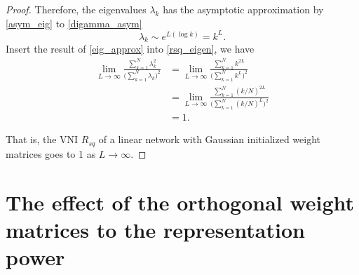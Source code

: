 \begin{proof}
    Therefore, the eigenvalues $\lambda_k$ has the asymptotic approximation by \eqref{asym_eig} to
    \eqref{digamma_asym}
    \begin{equation}
        \lambda_k\sim e^{L(\log k)}=k^L.
        \label{eig_approx}
    \end{equation}
    Insert the result of \eqref{eig_approx} into \eqref{rsq_eigen}, we have
    \begin{equation}
        \begin{aligned}
        \lim_{L\rightarrow\infty}\frac{\sum_{k=1}^N \lambda_k^2}{\big(\sum_{k=1}^N \lambda_k\big)^2}
        &=\lim_{L\rightarrow\infty}\frac{\sum_{k=1}^N k^{2L}}{\big(\sum_{k=1}^N k^L\big)^2}\\
        &=\lim_{L\rightarrow\infty}\frac{\sum_{k=1}^N (k/N)^{2L}}{\big(\sum_{k=1}^N (k/N)^L\big)^2}\\
        &=1.
        \end{aligned}
        \label{eig_result}
    \end{equation}

    That is, the VNI $R_{sq}$ of
    a linear network with Gaussian initialized weight matrices goes to 1 as $L\rightarrow\infty$.

\end{proof}



\section{The effect of the orthogonal weight matrices to the representation power} \label{repr_orthogonal}

